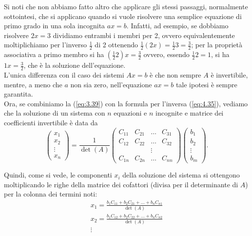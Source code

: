 \begin{osservazione}
  Si noti che non abbiamo fatto altro che applicare gli stessi passaggi, normalmente sottointesi, che si applicano
  quando si vuole risolvere una semplice equazione di primo grado in una sola incognita $ax=b$. Infatti, ad
  esempio, se dobbiamo risolvere $2x=3$ dividiamo entrambi i membri per 2, ovvero equivalentemente moltiplichiamo
  per l'inverso $\frac{1}{2}$ di 2 ottenendo $\frac{1}{2}(2x)=\frac{1}{2}3=\frac{3}{2}$; per la proprietà
  associativa a primo membro si ha $\left(\frac{1}{2}2\right)x=\frac{3}{2}$ ovvero, essendo $\frac{1}{2}2=1$, si
  ha $1x=\frac{3}{2}$, che è la soluzione dell'equazione.\\
  L'unica differenza con il caso dei sistemi $Ax=b$ è che non sempre $A$ è invertibile, mentre, a meno che $a$ non
  sia zero, nell'equazione $ax=b$ tale ipotesi è sempre garantita.\\
  Ora, se combiniamo la (\ref{eq:3.39}) con la formula per l'inversa (\ref{eq:4.35}), vediamo che la soluzione di
  un sistema con $n$ equazioni e $n$ incognite e matrice dei coefficienti invertibile è data da
  \begin{equation}
    \label{eq:3.40}
     \begin{pmatrix}
        x_1\\
        x_2\\
        \vdots\\
        x_n
    \end{pmatrix}=\frac{1}{\det(A)}
    \begin{pmatrix}
      C_{11} & C_{21} & \dots & C_{31}\\
      C_{12} & C_{22} & \dots & C_{32}\\
      &&\vdots\\ 
      C_{1n} & C_{2n} & \dots & C_{nn}
    \end{pmatrix} 
    \begin{pmatrix}
        b_1\\
        b_2\\
        \vdots\\
        b_m
    \end{pmatrix}.
  \end{equation}
\end{osservazione}
Quindi, come si vede, le componenti $x_i$ della soluzione del sistema si ottengono moltiplicando le righe della
matrice dei cofattori (divisa per il determinante di $A$) per la colonna dei termini noti:
\begin{eqnarray*}
  x_1=\frac{b_1C_{11}+b_2C_{21}+\dots+b_nC_{n1}}{\det(A)}\\
  x_2=\frac{b_1C_{12}+b_2C_{22}+\dots+b_nC_{n2}}{\det(A)}\\
  \vdots
\end{eqnarray*}
